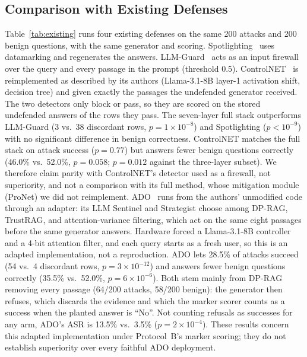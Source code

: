 \documentclass[conference,a4paper]{IEEEtran}
\begin{document}
\subsection{Comparison with Existing Defenses}
Table~\ref{tab:existing} runs four existing defenses on the same 200 attacks and 200 benign questions, with the same generator and scoring. Spotlighting~\cite{hines2024spotlighting} uses datamarking and regenerates the answers. LLM-Guard~\cite{protectai2024} acts as an input firewall over the query and every passage in the prompt (threshold 0.5). ControlNET~\cite{yao2025controlnet} is reimplemented as described by its authors (Llama-3.1-8B layer-1 activation shift, decision tree) and given exactly the passages the undefended generator received. The two detectors only block or pass, so they are scored on the stored undefended answers of the rows they pass. The seven-layer full stack outperforms LLM-Guard (3 vs.\ 38 discordant rows, $p=1\times10^{-8}$) and Spotlighting ($p<10^{-9}$) with no significant difference in benign correctness. ControlNET matches the full stack on attack success ($p=0.77$) but answers fewer benign questions correctly (46.0\% vs.\ 52.0\%, $p=0.058$; $p=0.012$ against the three-layer subset). We therefore claim parity with ControlNET's detector used as a firewall, not superiority, and not a comparison with its full method, whose mitigation module (ProNet) we did not reimplement. ADO~\cite{palleria2026ado} runs from the authors' unmodified code through an adapter: its LLM Sentinel and Strategist choose among DP-RAG, TrustRAG, and attention-variance filtering, which act on the same eight passages before the same generator answers. Hardware forced a Llama-3.1-8B controller and a 4-bit attention filter, and each query starts as a fresh user, so this is an adapted implementation, not a reproduction. ADO lets 28.5\% of attacks succeed (54 vs.\ 4 discordant rows, $p=3\times10^{-12}$) and answers fewer benign questions correctly (35.5\% vs.\ 52.0\%, $p=6\times10^{-6}$). Both stem mainly from DP-RAG removing every passage (64/200 attacks, 58/200 benign): the generator then refuses, which discards the evidence and which the marker scorer counts as a success when the planted answer is ``No''. Not counting refusals as successes for any arm, ADO's ASR is 13.5\% vs.\ 3.5\% ($p=2\times10^{-4}$). These results concern this adapted implementation under Protocol~B's marker scoring; they do not establish superiority over every faithful ADO deployment.
\end{document}

